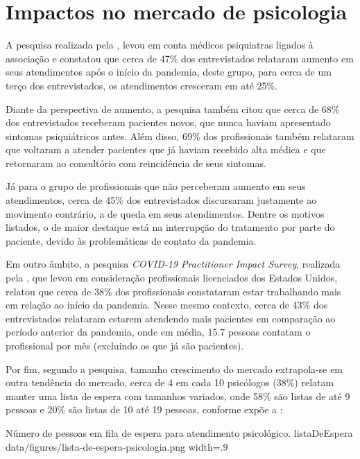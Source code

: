 \section{Impactos no mercado de psicologia}
\label{sec:impactoPsicologia}

A pesquisa realizada pela , levou em conta médicos psiquiatras ligados à associação e constatou que cerca de 47\% dos entrevistados relataram aumento em seus atendimentos após o início da pandemia, deste grupo, para cerca de um terço dos entrevistados, os atendimentos cresceram em até 25\%.

Diante da perspectiva de aumento, a pesquisa também citou que cerca de 68\% dos entrevistados receberam pacientes novos, que nunca haviam apresentado sintomas psiquiátricos antes. Além disso, 69\% dos profissionais também relataram que voltaram a atender pacientes que já haviam recebido alta médica e que retornaram ao consultório com reincidência de seus sintomas.

Já para o grupo de profissionais que não perceberam aumento em seus atendimentos, cerca de 45\% dos entrevistados discursaram justamente ao movimento contrário, a de queda em seus atendimentos. Dentre os motivos listados, o de maior destaque está na interrupção do tratamento por parte do paciente, devido às problemáticas de contato da pandemia.

Em outro âmbito, a pesquisa \textit{COVID-19 Practitioner Impact Survey}, realizada pela , que levou em consideração profissionais licenciados dos Estados Unidos, relatou que cerca de 38\% dos profissionais constataram estar trabalhando mais em relação ao início da pandemia. Nesse mesmo contexto, cerca de 43\% dos entrevistados relataram estarem atendendo mais pacientes em comparação ao período anterior da pandemia, onde em média, 15.7 pessoas contatam o profissional por mês (excluindo os que já são pacientes).

Por fim, segundo a pesquisa, tamanho crescimento do mercado extrapola-se em outra tendência do mercado, cerca de 4 em cada 10 psicólogos (38\%) relatam manter uma lista de espera com tamanhos variados, onde 58\% são listas de até 9 pessoas e 20\% são listas de 10 até 19 pessoas, conforme expõe a :

\image
    {Número de pessoas em fila de espera para atendimento psicológico.}
    {listaDeEspera}
    {data/figures/lista-de-espera-psicologia.png}
    {width=.9\textwidth}
    {}